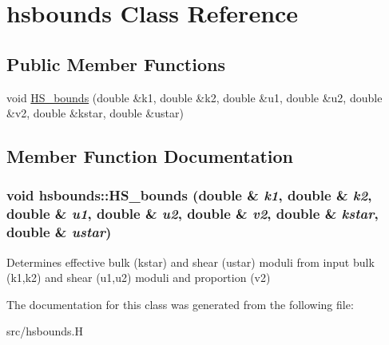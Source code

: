 \hypertarget{classhsbounds}{
\section{hsbounds Class Reference}
\label{classhsbounds}
}
\subsection*{Public Member Functions}
\begin{DoxyCompactItemize}
\item 
void \hyperlink{classhsbounds_ae123add2b2e7e403d66161bf89fce8e5}{HS\_\-bounds} (double \&k1, double \&k2, double \&u1, double \&u2, double \&v2, double \&kstar, double \&ustar)
\end{DoxyCompactItemize}


\subsection{Member Function Documentation}
\hypertarget{classhsbounds_ae123add2b2e7e403d66161bf89fce8e5}{
\subsubsection[{HS\_\-bounds}]{\setlength{\rightskip}{0pt plus 5cm}void hsbounds::HS\_\-bounds (double \& {\em k1}, \/  double \& {\em k2}, \/  double \& {\em u1}, \/  double \& {\em u2}, \/  double \& {\em v2}, \/  double \& {\em kstar}, \/  double \& {\em ustar})}}
\label{classhsbounds_ae123add2b2e7e403d66161bf89fce8e5}
Determines effective bulk (kstar) and shear (ustar) moduli from input bulk (k1,k2) and shear (u1,u2) moduli and proportion (v2) 

The documentation for this class was generated from the following file:\begin{DoxyCompactItemize}
\item 
src/hsbounds.H\end{DoxyCompactItemize}
